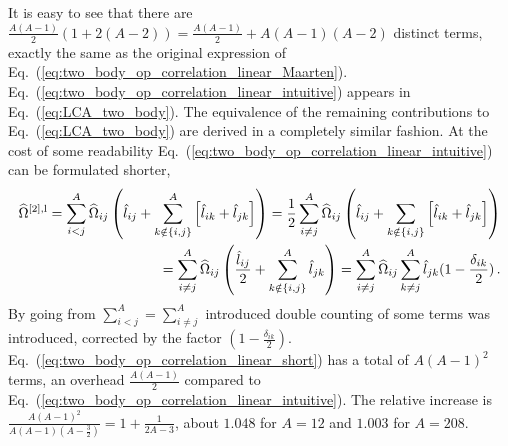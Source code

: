 \documentclass[10pt]{article}
\begin{document}
It is easy to see that there are $\frac{A(A-1)}{2}(1 + 2(A-2)) = \frac{A(A-1)}{2} + A(A-1)(A-2)$ distinct terms, exactly the same as the original expression of Eq.~(\ref{eq:two_body_op_correlation_linear_Maarten}).
Eq.~(\ref{eq:two_body_op_correlation_linear_intuitive}) appears in Eq.~(\ref{eq:LCA_two_body}). The equivalence of the remaining contributions to Eq.~(\ref{eq:LCA_two_body}) are derived in a completely similar fashion.
At the cost of some readability Eq.~(\ref{eq:two_body_op_correlation_linear_intuitive}) can be formulated shorter,
\begin{align}
	\widehat{\Omega}^{[2],\text{l}} =
	\sum_{i<j}^{A} \widehat{\Omega}_{ij}  \left( \hat{l}_{ij} + 
	\sum_{k \notin\{i,j\}}^{A}
	\left[ 
	\hat{l}_{ik} + \hat{l}_{jk} 
	\right]	
	\right) = \frac{1}{2}\sum_{i \neq j}^{A} \widehat{\Omega}_{ij}  \left( \hat{l}_{ij} + 
	\sum_{k \notin\{i,j\}}
	\left[ 
	\hat{l}_{ik} + \hat{l}_{jk} 
	\right]	
	\right) \notag \\
	= \sum_{i \neq j}^{A} \widehat{\Omega}_{ij}  \left( \frac{\hat{l}_{ij}}{2} + 
	\sum_{k \notin\{i,j\}}^{A} \hat{l}_{jk}
	\right) =
	\sum_{i \neq j}^{A} \widehat{\Omega}_{ij} 
	\sum_{k \neq j}^{A} \hat{l}_{jk} ( 1 - \frac{\delta_{ik}}{2}) \, .
	\label{eq:two_body_op_correlation_linear_short}
\end{align}
By going from $ \sum_{i<j}^{A} = \sum_{i \neq j}^{A}$ introduced double counting of some terms was introduced, corrected by the factor $( 1 - \frac{\delta_{ik}}{2})$. Eq.~(\ref{eq:two_body_op_correlation_linear_short}) has a total of $A(A-1)^{2}$ terms, an overhead $\frac{A(A-1)}{2}$ compared to Eq.~(\ref{eq:two_body_op_correlation_linear_intuitive}). The relative increase is $ \frac{A(A-1)^{2}}{A(A-1)(A-\frac{3}{2})} = 1 + \frac{1}{2A-3}$, about $1.048$ for $A=12$ and $1.003$ for $A=208$.
\end{document}
